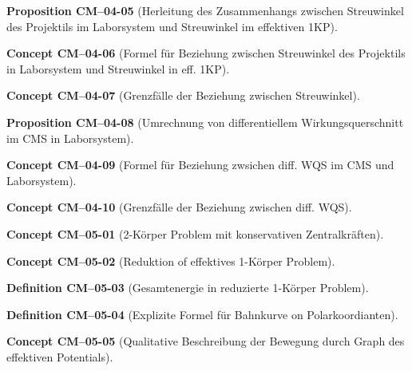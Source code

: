 \documentclass[10pt, letterpaper]{article}
\newcommand{\CustomHeading}[3]{%
  \par\medskip\noindent%
  \textbf{#1 #2} \textnormal{(#3)}.\enskip%
}
\newenvironment{DEF}[2]{\CustomHeading{Definition}{#1}{#2}}{}
\newenvironment{PROP}[2]{\CustomHeading{Proposition}{#1}{#2}}{}
\newenvironment{CONC}[2]{\CustomHeading{Concept}{#1}{#2}}{}
\begin{document}
\begin{PROP}{CM--04-05}{Herleitung des Zusammenhangs zwischen Streuwinkel des Projektils im Laborsystem und Streuwinkel im effektiven 1KP}
\end{PROP}

\begin{CONC}{CM--04-06}{Formel für Beziehung zwischen Streuwinkel des Projektils in Laborsystem und Streuwinkel in eff. 1KP}
\end{CONC}

\begin{CONC}{CM--04-07}{Grenzfälle der Beziehung zwischen Streuwinkel}
\end{CONC}

\begin{PROP}{CM--04-08}{Umrechnung von differentiellem Wirkungsquerschnitt im CMS in Laborsystem}
\end{PROP}

\begin{CONC}{CM--04-09}{Formel für Beziehung zwsichen diff. WQS im CMS und Laborsystem}
\end{CONC}

\begin{CONC}{CM--04-10}{Grenzfälle der Beziehung zwischen diff. WQS}
\end{CONC}

\begin{CONC}{CM--05-01}{2-Körper Problem mit konservativen Zentralkräften}
\end{CONC}

\begin{CONC}{CM--05-02}{Reduktion of effektives 1-Körper Problem}
\end{CONC}

\begin{DEF}{CM--05-03}{Gesamtenergie in reduzierte 1-Körper Problem}
\end{DEF}

\begin{DEF}{CM--05-04}{Explizite Formel für Bahnkurve on Polarkoordianten}
\end{DEF}

\begin{CONC}{CM--05-05}{Qualitative Beschreibung der Bewegung durch Graph des effektiven Potentials}
\end{CONC}
\end{document}
